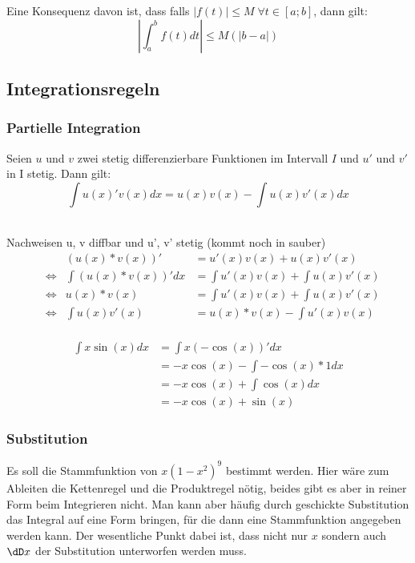 \begin{Bemerkung}
  Eine Konsequenz davon ist, dass falls $|f(t)|\leq M \; \forall t \in [a;b]$, dann gilt:
  $$\left|\int_a^b f(t)dt \right| \leq M(|b-a|)$$
\end{Bemerkung}
\subsection{Integrationsregeln}
\subsubsection{Partielle Integration}
\begin{Theorem}
  Seien $u$ und $v$ zwei stetig differenzierbare Funktionen im Intervall $I$ und $u'$
  und $v'$ in I stetig. Dann gilt:
  $$\int u(x)'v(x) dx= u(x)v(x) - \int u(x)v'(x) dx$$
\end{Theorem}
\begin{Beweis}\\
Nachweisen u, v diffbar und u', v' stetig (kommt noch in sauber)\\
\begin{align*}
  &&(u(x)*v(x))' &= u'(x)v(x)+u(x)v'(x)\\
  &\Leftrightarrow & \int (u(x)*v(x))' dx &= \int u'(x)v(x)+\int u(x)v'(x)\\
  &\Leftrightarrow & u(x)*v(x) &= \int u'(x)v(x)+\int u(x)v'(x)\\
  &\Leftrightarrow & \int u(x)v'(x) &= u(x)*v(x)- \int u'(x)v(x)\\
\end{align*}
\end{Beweis}
\begin{Beispiel}
  \begin{align*}
  \int x\sin(x) dx &= \int x(-\cos(x))' dx\\
  &= -x\cos(x) - \int-\cos(x)*1 dx\\
  &= -x\cos(x) + \int\cos(x) dx\\
  &= -x\cos(x) + \sin(x)
\end{align*}
\end{Beispiel}
\subsubsection{Substitution}
Es soll die Stammfunktion von $x(1-x^2)^9$ bestimmt werden. Hier wäre zum
Ableiten die Kettenregel und die Produktregel nötig, beides gibt es aber in
reiner Form beim Integrieren nicht. Man kann aber häufig durch geschickte
Substitution das Integral auf eine Form bringen, für die dann eine
Stammfunktion angegeben werden kann. Der wesentliche Punkt dabei ist, dass
nicht nur $x$ sondern auch $\dD x$ der Substitution unterworfen werden muss.

